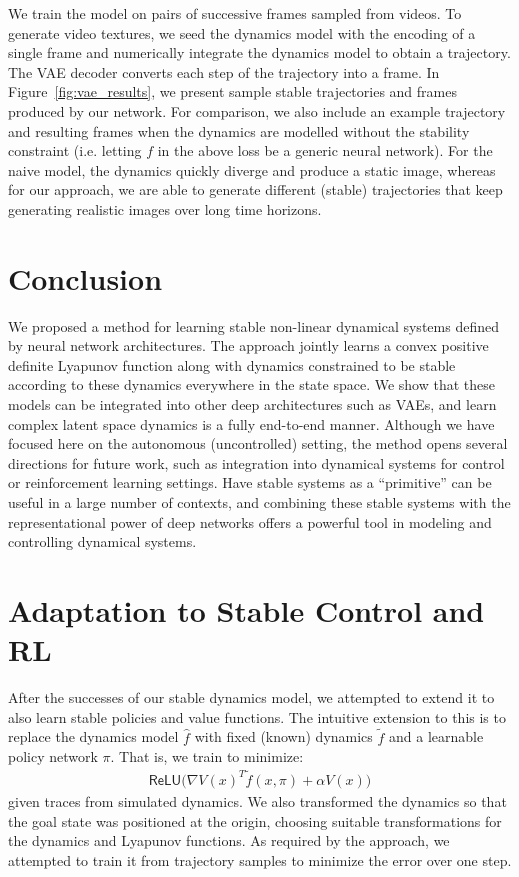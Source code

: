 We train the model on pairs of successive frames sampled from videos. To generate video textures, we seed the dynamics model with the encoding of a single frame and numerically integrate the dynamics model to obtain a trajectory. The VAE decoder converts each step of the trajectory into a frame. In Figure~\ref{fig:vae_results}, we present sample stable trajectories and frames produced by our network. For comparison, we also include an example trajectory and resulting frames when the dynamics are modelled without the stability constraint (i.e. letting $f$ in the above loss be a generic neural network).  For the naive model, the dynamics quickly diverge and produce a static image, whereas for our approach, we are able to generate different (stable) trajectories that keep generating realistic images over long time horizons.

\section{Conclusion}

We proposed a method for learning stable non-linear dynamical systems defined by neural network architectures. The approach jointly learns a convex positive definite Lyapunov function along with dynamics constrained to be stable according to these dynamics everywhere in the state space.  We show that these models can be integrated into other deep architectures such as VAEs, and learn complex latent space dynamics is a fully end-to-end manner.  Although we have focused here on the autonomous (uncontrolled) setting, the method opens several directions for future work, such as integration into dynamical systems for control or reinforcement learning settings.  Have stable systems as a ``primitive'' can be useful in a large number of contexts, and combining these stable systems with the representational power of deep networks offers a powerful tool in modeling and controlling dynamical systems.


\section{Adaptation to Stable Control and RL }

After the successes of our stable dynamics model, we attempted to extend it to also learn stable policies and value functions. The intuitive extension to this is to replace the dynamics model $\hat f$ with fixed (known) dynamics $\tilde f$ and a learnable policy network $\pi$. That is, we train to minimize:
\begin{align}
  \mathsf{ReLU}\bigl(\nabla V(x)^T \tilde{f}(x, \pi) + \alpha V (x) \bigr)
\end{align}
given traces from simulated dynamics. We also transformed the dynamics so that the goal state was positioned at the origin, choosing suitable transformations for the dynamics and Lyapunov functions. As required by the approach, we attempted to train it from trajectory samples to minimize the error over one step.

